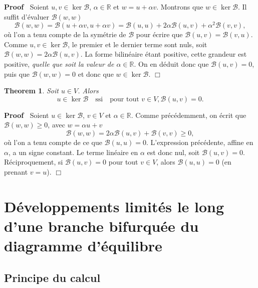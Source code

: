 \documentclass{article}
\newcommand{\tmem}[1]{{\em #1\/}}
\newenvironment{proof}{\noindent\textbf{Proof\ }}{\hspace*{\fill}$\Box$\medskip}
\newtheorem{theorem}{Theorem}
\begin{document}
\begin{proof}
  Soient $u, v∈\ker \mathcal{B}$, $\alpha∈\mathbb{R}$ et $w = u +
  \alpha v$. Montrons que $w∈\ker \mathcal{B}$. Il suffit d'évaluer
  $\mathcal{B} (w, w)$
  \begin{equation}
    \mathcal{B} (w, w) =\mathcal{B} (u + \alpha v, u + \alpha v) =\mathcal{B}
    (u, u) + 2 \alpha \mathcal{B} (u, v) + \alpha^2 \mathcal{B} (v, v),
  \end{equation}
  où l'on a tenu compte de la symétrie de $\mathcal{B}$ pour
  écrire que $\mathcal{B} (u, v) =\mathcal{B} (v, u)$. Comme $u, v \in
  \ker \mathcal{B}$, le premier et le dernier terme sont nuls, soit
  $\mathcal{B} (w, w) = 2 \alpha \mathcal{B} (u, v)$. La forme bilinéaire
  étant positive, cette grandeur est positive, {\tmem{quelle que soit la
  valeur de $\alpha∈\mathbb{R}$}}. On en déduit donc que $\mathcal{B}
  (u, v) = 0$, puis que $\mathcal{B} (w, w) = 0$ et donc que $w∈\ker
  \mathcal{B}.$
\end{proof}

\begin{theorem}
  Soit $u∈V$. Alors
  \begin{equation}
    u∈\ker \mathcal{B} \quad \text{ssi} \quad \text{pour tout } v∈V,
    \mathcal{B} (u, v) = 0.
  \end{equation}
\end{theorem}

\begin{proof}
  Soient $u∈\ker \mathcal{B}$, $v∈V$ et $\alpha∈\mathbb{R}$. Comme
  précédemment, on écrit que $\mathcal{B} (w, w) \geq 0$, avec $w
  = \alpha u + v$
  \begin{equation}
    \mathcal{B} (w, w) = 2 \alpha \mathcal{B} (u, v) +\mathcal{B} (v, v) \geq
    0,
  \end{equation}
  où l'on a tenu compte de ce que $\mathcal{B} (u, u) = 0$. L'expression
  précédente, affine en $\alpha$, a un signe constant. Le terme
  linéaire en $\alpha$ est donc nul, soit $\mathcal{B} (u, v) = 0$.
  Réciproquement, si $\mathcal{B} (u, v) = 0$ pour tout $v∈V$, alors
  $\mathcal{B} (u, u) = 0$ (en prenant $v = u$).
\end{proof}

\section{Développements limités le long d'une branche bifurquée du
diagramme d'équilibre}

\subsection{Principe du calcul}\label{sec20220107121442}
\end{document}
